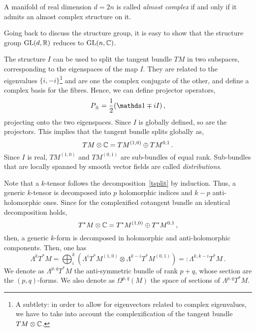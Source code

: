 \documentclass[debug]{phd}
\begin{document}
						A manifold of real dimension $d=2n$ is called \emph{almost complex} if and only if it admits an almost complex structure on it.
						
						Going back to discuss the structure group, it is easy to show that the structure group $\mathrm{GL}(d, \mathbb{R})$ reduces to $\mathrm{GL}(n, \mathbb{C})$.
						
						The structure $I$ can be used to split the tangent bundle $TM$ in two subspaces, corresponding to the eigenspaces of the map $I$. 
						They are related to the eigenvalues $\{ i, -i \}$\footnote{%
							A subtlety: in order to allow for eigenvectors related to complex eigenvalues, we have to take into account the complexification of the tangent bundle $TM \otimes \mathbb{C}$.%
							}
						and are one the complex conjugate of the other, and define a complex basis for the fibres.
						Hence, we can define projector operators,
								\begin{equation}\label{projL}
									P_{\pm} = \frac{1}{2}\left(\id \mp i I \right)\, ,
								\end{equation}
						projecting onto the two eigenspaces.
						Since $I$ is globally defined, so are the projectors. This implies that the tangent bundle splits globally as,
								\begin{equation}\label{tsplit}
									TM \otimes \mathbb{C} = TM^{(1,0)} \oplus TM^{0,1}	\, .
								\end{equation}
						Since $I$ is real, $TM^{(1,0)}$ and $TM^{(0,1)}$ are sub-bundles of equal rank.
						Sub-bundles that are locally spanned by smooth vector fields are called \emph{distributions}.
						
						Note that a $k$-tensor follows the decomposition~\eqref{tsplit} by induction. 
						Thus, a generic $k$-tensor is decomposed into $p$ holomorphic indices and $k-p$ anti-holomorphic ones.
						Since for the complexified cotangent bundle an identical decomposition holds,
								\begin{equation}
									T^*M \otimes \mathbb{C} = T^*M^{(1,0)} \oplus T^*M^{0,1}\, ,
								\end{equation}
						then, a generic $k$-form is decomposed in holomorphic and anti-holomorphic components.
						Then, one has
								\begin{equation}
									\Lambda^k T^*M = \bigoplus_{i}^k \left( \Lambda^i T^*M^{(1,0)} \otimes \Lambda^{k-i} T^*M^{(0,1)} \right) =: \Lambda^{k,k-i} T^*M\, .
								\end{equation}
						We denote as $\Lambda^{p,q} T^*M$ the anti-symmetric bundle of rank $p+q$, whose section are the $(p,q)$-forms.
						We also denote as $\Omega^{p,q}(M)$ the space of sections of $\Lambda^{p,q} T^*M$.
						
\end{document}

